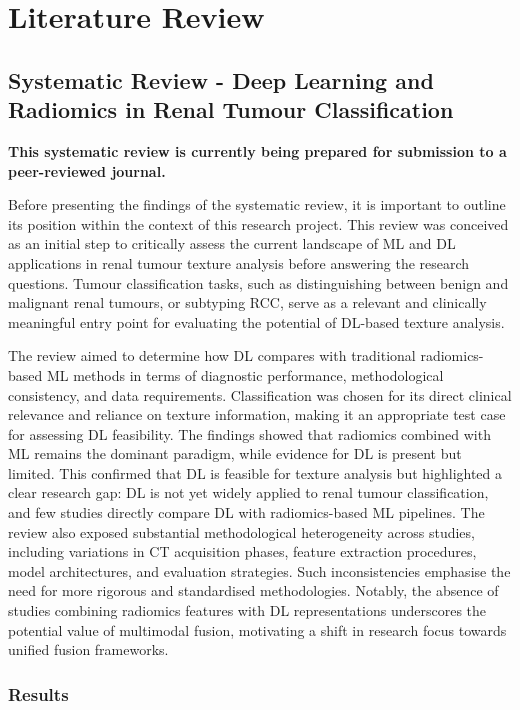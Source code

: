 \chapter{Literature Review}\label{chap:survey}

\section{Systematic Review - Deep Learning and Radiomics in Renal Tumour Classification}
\textbf{This systematic review is currently being prepared for submission to a peer-reviewed journal.}

\vspace{2mm}

Before presenting the findings of the systematic review, it is important to outline its position within the context of this research project. This review was conceived as an initial step to critically assess the current landscape of ML and DL applications in renal tumour texture analysis before answering the research questions. Tumour classification tasks, such as distinguishing between benign and malignant renal tumours, or subtyping RCC, serve as a relevant and clinically meaningful entry point for evaluating the potential of DL-based texture analysis.


The review aimed to determine how DL compares with traditional radiomics-based ML methods in terms of diagnostic performance, methodological consistency, and data requirements. Classification was chosen for its direct clinical relevance and reliance on texture information, making it an appropriate test case for assessing DL feasibility. The findings showed that radiomics combined with ML remains the dominant paradigm, while evidence for DL is present but limited. This confirmed that DL is feasible for texture analysis but highlighted a clear research gap: DL is not yet widely applied to renal tumour classification, and few studies directly compare DL with radiomics-based ML pipelines. The review also exposed substantial methodological heterogeneity across studies, including variations in CT acquisition phases, feature extraction procedures, model architectures, and evaluation strategies. Such inconsistencies emphasise the need for more rigorous and standardised methodologies. Notably, the absence of studies combining radiomics features with DL representations underscores the potential value of multimodal fusion, motivating a shift in research focus towards unified fusion frameworks.


\subsection{Results}\label{subsec:result}
            
